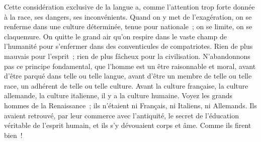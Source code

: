 \documentclass[french,twoside]{book} %
\begin{document}
Cette considération exclusive de la langue a, comme l’attention trop forte donnée à la race, ses dangers, ses inconvénients. Quand on y met de l’exagération, on se renferme dans une culture déterminée, tenue pour nationale ; on se limite, on se claquemure. On quitte le grand air qu’on respire dans le vaste champ de l’humanité pour s’enfermer dans des conventicules de compatriotes. Rien de plus mauvais pour l’esprit ; rien de plus fâcheux pour la civilisation. N’abandonnons pas ce principe fondamental, que l’homme est un être raisonnable et moral, avant d’être parqué dans telle ou telle langue, avant d’être un membre de telle ou telle race, un adhérent de telle ou telle culture. Avant la culture française, la culture allemande, la culture italienne, il y a la culture humaine. Voyez les grands hommes de la Renaissance ; ils n’étaient ni Français, ni Italiens, ni Allemands. Ils avaient retrouvé, par leur commerce avec l’antiquité, le secret de l’éducation véritable de l’esprit humain, et ils s’y dévouaient corps et âme. Comme ils firent bien !
\end{document}
